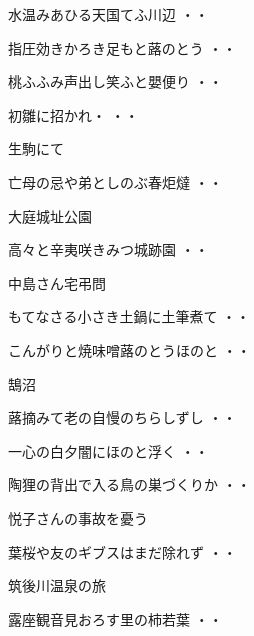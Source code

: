 \begin{shiika}水温みあひる天国てふ川辺
\hfill{・・}\end{shiika}
\begin{shiika}指圧効きかろき足もと蕗のとう
\hfill{・・}\end{shiika}
\begin{shiika}桃ふふみ声出し笑ふと嬰便り
\hfill{・・}\end{shiika}
\begin{shiika}初雛に招かれ・
\hfill{・・}\end{shiika}
\vspace{0.6cm}
生駒にて
\begin{shiika}亡母の忌や弟としのぶ春炬燵
\hfill{・・}\end{shiika}
\vspace{0.6cm}
大庭城址公園
\begin{shiika}高々と辛夷咲きみつ城跡園
\hfill{・・}\end{shiika}
\vspace{0.6cm}
中島さん宅弔問
\begin{shiika}もてなさる小さき土鍋に土筆煮て
\hfill{・・}\end{shiika}
\begin{shiika}こんがりと焼味噌蕗のとうほのと
\hfill{・・}\end{shiika}
\vspace{0.6cm}
鵠沼
\begin{shiika}蕗摘みて老の自慢のちらしずし
\hfill{・・}\end{shiika}
\begin{shiika}一心の白夕闇にほのと浮く
\hfill{・・}\end{shiika}
\begin{shiika}陶狸の背出で入る鳥の巣づくりか
\hfill{・・}\end{shiika}
\vspace{0.6cm}
悦子さんの事故を憂う
\begin{shiika}葉桜や友のギブスはまだ除れず
\hfill{・・}\end{shiika}
\vspace{0.6cm}
筑後川温泉の旅
\begin{shiika}露座観音見おろす里の柿若葉
\hfill{・・}\end{shiika}
